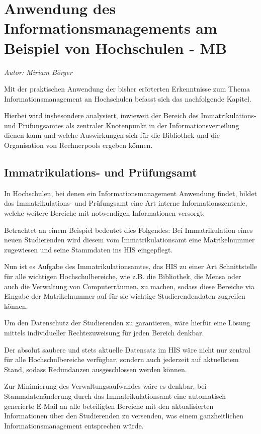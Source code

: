 \section{Anwendung des Informationsmanagements am Beispiel von Hochschulen - MB}
\textit{Autor: Miriam Börger}

Mit der praktischen Anwendung der bisher erörterten Erkenntnisse zum Thema Informationsmanagement an Hochschulen befasst sich das nachfolgende Kapitel. 

Hierbei wird insbesondere analysiert, inwieweit der Bereich des Immatrikulations- und Prüfungsamtes als zentraler Knotenpunkt in der Informationsverteilung dienen kann und welche Auswirkungen sich für die Bibliothek und die Organisation von Rechnerpools ergeben können.

\subsection{Immatrikulations- und Prüfungsamt}
In Hochschulen, bei denen ein Informationsmanagement Anwendung findet, bildet das Immatrikulations- und Prüfungsamt eine Art interne Informationszentrale, welche weitere Bereiche mit notwendigen Informationen versorgt. 

Betrachtet an einem Beispiel bedeutet dies Folgendes: Bei Immatrikulation eines neuen Studierenden wird diesem vom Immatrikulationsamt eine Matrikelnummer zugewiesen und seine Stammdaten ins HIS eingepflegt. 

Nun ist es Aufgabe des Immatrikulationsamtes, das HIS zu einer Art Schnittstelle für alle wichtigen Hochschulbereiche, wie z.B. die Bibliothek, die Mensa oder auch die Verwaltung von Computerräumen, zu machen, sodass diese Bereiche via Eingabe der Matrikelnummer auf für sie wichtige Studierendendaten zugreifen können.

Um den Datenschutz der Studierenden zu garantieren, wäre hierfür eine Lösung mittels individueller Rechtezuweisung für jeden Bereich denkbar.

Der absolut saubere und stets aktuelle Datensatz im HIS wäre nicht nur zentral für alle Hochschulbereiche verfügbar, sondern auch jederzeit auf aktuellstem Stand, sodass Redundanzen ausgeschlossen werden können.

Zur Minimierung des Verwaltungsaufwandes wäre es denkbar, bei Stammdatenänderung durch das Immatrikulationsamt eine automatisch generierte E-Mail an alle beteiligten Bereiche mit den aktualisierten Informationen über den Studierenden zu versenden, was einem ganzheitlichen Informationsmanagement entsprechen würde.

